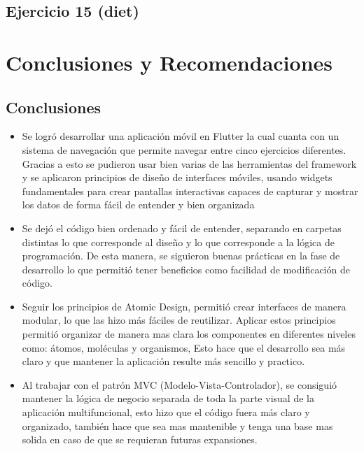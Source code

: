 \documentclass[12pt,letterpaper]{article}
\begin{document}
\subsection{Ejercicio 15 (diet)}



\section{Conclusiones y Recomendaciones}
\subsection{Conclusiones}

\begin{itemize}
    \item Se logró desarrollar una aplicación móvil en Flutter la cual cuanta con un sistema de navegación que permite navegar entre cinco ejercicios diferentes. Gracias a esto se pudieron usar bien varias de las herramientas del framework y se aplicaron principios de diseño de interfaces móviles, usando widgets fundamentales para crear pantallas interactivas capaces de capturar y mostrar los datos de forma fácil de entender y bien organizada
    \item Se dejó el código bien ordenado y fácil de entender, separando en carpetas distintas lo que corresponde al diseño y lo que corresponde a la lógica de programación. De esta manera, se siguieron buenas prácticas en la fase de desarrollo lo que permitió tener beneficios como facilidad de modificación de código.
    \item Seguir los principios de Atomic Design, permitió crear interfaces de manera modular, lo que las hizo más fáciles de reutilizar. Aplicar estos principios permitió organizar de manera mas clara los componentes en diferentes niveles como: átomos, moléculas y organismos, Esto hace que el desarrollo sea más claro y que mantener la aplicación resulte más sencillo y practico.
    \item Al trabajar con el patrón MVC (Modelo-Vista-Controlador), se consiguió mantener la lógica de negocio separada de toda la parte visual de la aplicación multifuncional, esto hizo que el código fuera más claro y organizado, también hace que sea mas mantenible y tenga una base mas solida en caso de que se requieran futuras expansiones.
\end{itemize}
\end{document}
